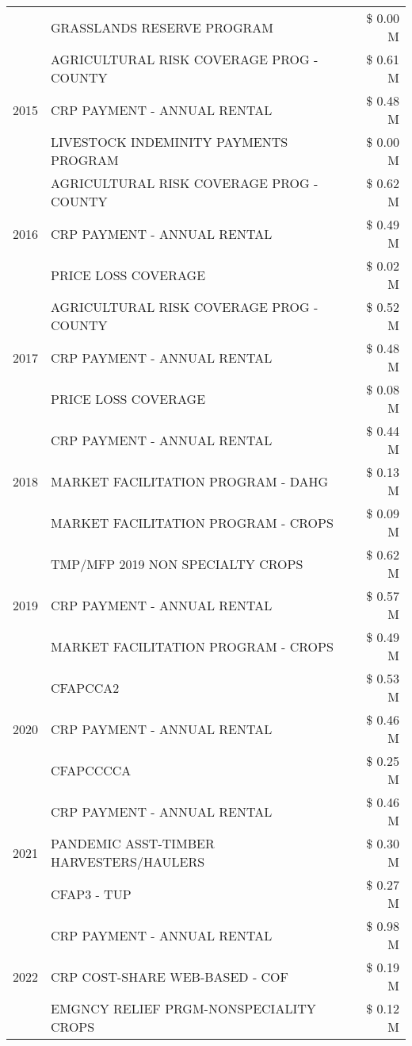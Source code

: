 \begin{tabular}{llr}
 & GRASSLANDS RESERVE PROGRAM & \$ 0.00 M \\
\cline{1-3}
\multirow[t]{3}{*}{2015} & AGRICULTURAL RISK COVERAGE PROG - COUNTY & \$ 0.61 M \\
 & CRP PAYMENT - ANNUAL RENTAL & \$ 0.48 M \\
 & LIVESTOCK INDEMINITY PAYMENTS PROGRAM & \$ 0.00 M \\
\cline{1-3}
\multirow[t]{3}{*}{2016} & AGRICULTURAL RISK COVERAGE PROG - COUNTY & \$ 0.62 M \\
 & CRP PAYMENT - ANNUAL RENTAL & \$ 0.49 M \\
 & PRICE LOSS COVERAGE & \$ 0.02 M \\
\cline{1-3}
\multirow[t]{3}{*}{2017} & AGRICULTURAL RISK COVERAGE PROG - COUNTY & \$ 0.52 M \\
 & CRP PAYMENT - ANNUAL RENTAL & \$ 0.48 M \\
 & PRICE LOSS COVERAGE & \$ 0.08 M \\
\cline{1-3}
\multirow[t]{3}{*}{2018} & CRP PAYMENT - ANNUAL RENTAL & \$ 0.44 M \\
 & MARKET FACILITATION PROGRAM - DAHG & \$ 0.13 M \\
 & MARKET FACILITATION PROGRAM - CROPS & \$ 0.09 M \\
\cline{1-3}
\multirow[t]{3}{*}{2019} & TMP/MFP 2019 NON SPECIALTY CROPS & \$ 0.62 M \\
 & CRP PAYMENT - ANNUAL RENTAL & \$ 0.57 M \\
 & MARKET FACILITATION PROGRAM - CROPS & \$ 0.49 M \\
\cline{1-3}
\multirow[t]{3}{*}{2020} & CFAPCCA2 & \$ 0.53 M \\
 & CRP PAYMENT - ANNUAL RENTAL & \$ 0.46 M \\
 & CFAPCCCCA & \$ 0.25 M \\
\cline{1-3}
\multirow[t]{3}{*}{2021} & CRP PAYMENT - ANNUAL RENTAL & \$ 0.46 M \\
 & PANDEMIC ASST-TIMBER HARVESTERS/HAULERS & \$ 0.30 M \\
 & CFAP3 - TUP & \$ 0.27 M \\
\cline{1-3}
\multirow[t]{3}{*}{2022} & CRP PAYMENT - ANNUAL RENTAL & \$ 0.98 M \\
 & CRP COST-SHARE WEB-BASED - COF & \$ 0.19 M \\
 & EMGNCY RELIEF PRGM-NONSPECIALITY CROPS & \$ 0.12 M \\
\cline{1-3}
\bottomrule
\end{tabular}
